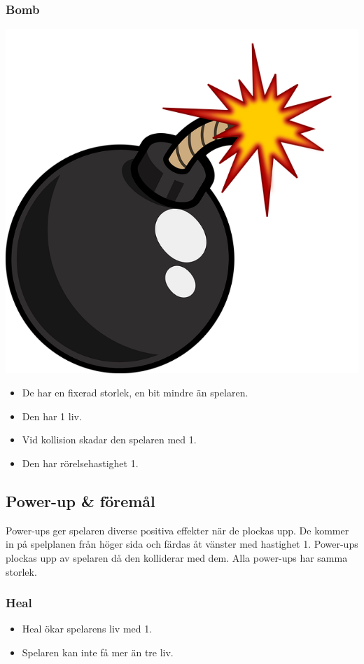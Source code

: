 \documentclass{TDP005mall}
\begin{document}
\subsubsection*{Bomb}
\includegraphics[scale=0.08]{Images/Bomb.png}\\
\begin{itemize}
\item De har en fixerad storlek, en bit mindre än spelaren.
\item Den har 1 liv.
\item Vid kollision skadar den spelaren med 1.
\item Den har rörelsehastighet 1.

\end{itemize}



\subsection{Power-up \& föremål}
Power-ups ger spelaren diverse positiva effekter när de plockas upp. De kommer in på spelplanen från höger sida och färdas åt vänster med hastighet 1. 
Power-ups plockas upp av spelaren då den kolliderar med dem. Alla power-ups har samma storlek.

\subsubsection*{Heal}
\begin{itemize}
\item Heal ökar spelarens liv med 1.
\item Spelaren kan inte få mer än tre liv.
\end{itemize}
\end{document}
